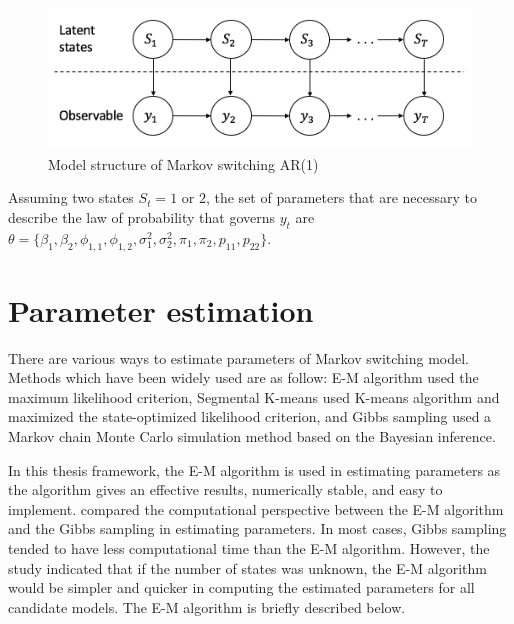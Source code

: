 \begin{figure}[H]
\begin{centering}
\includegraphics[scale=0.7]{picture/msm-ar1}
\par\end{centering}
\caption{Model structure of Markov switching AR(1)}
\label{msm-ar}
\end{figure}

Assuming two states $S_{t}=1$ or $2$, the set of parameters that
are necessary to describe the law of probability that governs $y_{t}$
are $\theta=\{\beta_{1},\beta_{2},\phi_{1,1},\phi_{1,2},\sigma_{1}^{2},\sigma_{2}^{2},\pi_{1},\pi_{2},p_{11},p_{22}\}$. 

\section{Parameter estimation}

There are various ways to estimate parameters of Markov switching
model. Methods which have been widely used are as follow: E-M algorithm
\citep{hamilton1990analysis,kim1994dynamic} used the maximum likelihood
criterion, Segmental K-means \citep{juang1990segmental} used K-means
algorithm and maximized the state-optimized likelihood criterion,
and Gibbs sampling \citep{kim1999state} used a Markov chain Monte
Carlo simulation method based on the Bayesian inference. 

In this thesis framework, the E-M algorithm is used in estimating
parameters as the algorithm gives an effective results, numerically
stable, and easy to implement. \citet{ryden2008versus} compared the
computational perspective between the E-M algorithm and the Gibbs
sampling in estimating parameters. In most cases, Gibbs sampling tended
to have less computational time than the E-M algorithm. However, the
study indicated that if the number of states was unknown, the E-M
algorithm would be simpler and quicker in computing the estimated
parameters for all candidate models. The E-M algorithm is briefly
described below. %

